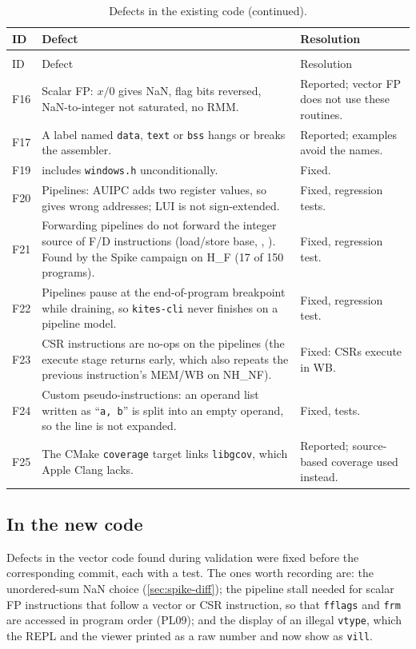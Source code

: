 \documentclass[11pt]{article}
\begin{document}
\small
\begin{longtable}{@{}L{0.8cm}L{8.8cm}L{5.5cm}@{}}
\caption{Defects in the existing code.}\label{tab:defects}\\
\toprule
ID & Defect & Resolution \\
\midrule
\endfirsthead
\caption[]{Defects in the existing code (continued).}\\
\toprule
ID & Defect & Resolution \\
\midrule
\endhead
F16 & Scalar FP: $x/0$ gives NaN, flag bits reversed, NaN-to-integer not saturated, no RMM. & Reported; vector FP does not use these routines. \\
F17 & A label named \texttt{data}, \texttt{text} or \texttt{bss} hangs or breaks the assembler. & Reported; examples avoid the names. \\
F19 &  includes \texttt{windows.h} unconditionally. & Fixed. \\
F20 & Pipelines: AUIPC adds two register values, so  gives wrong addresses; LUI is not sign-extended. & Fixed, regression tests. \\
F21 & Forwarding pipelines do not forward the integer source of F/D instructions (load/store base, , ). Found by the Spike campaign on H\_F (17 of 150 programs). & Fixed, regression test. \\
F22 & Pipelines pause at the end-of-program breakpoint while draining, so \texttt{kites-cli} never finishes on a pipeline model. & Fixed, regression test. \\
F23 & CSR instructions are no-ops on the pipelines (the execute stage returns early, which also repeats the previous instruction's MEM/WB on NH\_NF). & Fixed: CSRs execute in WB. \\
F24 & Custom pseudo-instructions: an operand list written as ``\texttt{a, b}'' is split into an empty operand, so the line is not expanded. & Fixed, tests. \\
F25 & The CMake \texttt{coverage} target links \texttt{libgcov}, which Apple Clang lacks. & Reported; source-based coverage used instead. \\
\bottomrule
\end{longtable}
\normalsize

\subsection{In the new code}
Defects in the vector code found during validation were fixed before the corresponding commit,
each with a test. The ones worth recording are: the unordered-sum NaN choice
(\cref{sec:spike-diff}); the pipeline stall needed for scalar FP instructions that follow a
vector or CSR instruction, so that \texttt{fflags} and \texttt{frm} are accessed in program order
(PL09); and the display of an illegal \texttt{vtype}, which the REPL and the viewer printed as a
raw number and now show as \texttt{vill}.
\end{document}
